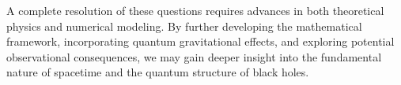 A complete resolution of these questions requires advances in both theoretical physics and numerical modeling. By further developing the mathematical framework, incorporating quantum gravitational effects, and exploring potential observational consequences, we may gain deeper insight into the fundamental nature of spacetime and the quantum structure of black holes.
